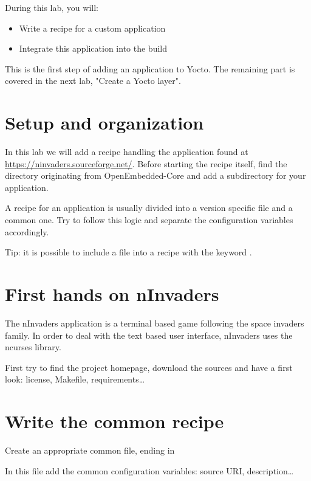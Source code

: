 
During this lab, you will:
\begin{itemize}
  \item Write a recipe for a custom application
  \item Integrate this application into the build
\end{itemize}

This is the first step of adding an application to Yocto. The
remaining part is covered in the next lab, "Create a Yocto layer".

\section{Setup and organization}

In this lab we will add a recipe handling the  application
found at \url{https://ninvaders.sourceforge.net/}. Before starting the recipe
itself, find the  directory originating from
OpenEmbedded-Core and add a subdirectory for your application.

A recipe for an application is usually divided into a version specific 
file and a common one. Try to follow this logic and separate the configuration
variables accordingly.

Tip: it is possible to include a file into a recipe with the keyword
.

\section{First hands on nInvaders}

The nInvaders application is a terminal based game following the space invaders
family. In order to deal with the text based user interface, nInvaders uses the
ncurses library.

First try to find the project homepage, download the sources and have a first
look: license, Makefile, requirements\dots

\section{Write the common recipe}

Create an appropriate common file, ending in 

In this file add the common configuration variables: source URI,
description\dots

